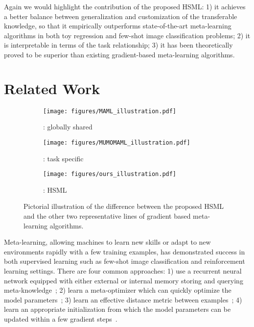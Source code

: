 \documentclass{article}
\begin{document}
Again we would highlight the contribution of the proposed HSML: 1) it achieves a better balance between generalization and customization of the transferable knowledge, so that it empirically outperforms state-of-the-art meta-learning algorithms in both toy regression and few-shot image classification problems; 2) it is interpretable in terms of the task relationship; 3) it has been theoretically proved to be superior than existing gradient-based meta-learning algorithms. \section{Related Work}
\begin{figure}[t]
	\centering
	\begin{subfigure}[c]{0.155\textwidth}
		\centering
		\texttt{[image: figures/MAML\_illustration.pdf]}
		\caption{\label{fig:maml}: globally shared}
	\end{subfigure}
	\begin{subfigure}[c]{0.155\textwidth}
		\centering
		\texttt{[image: figures/MUMOMAML\_illustration.pdf]}
		\caption{\label{fig:mumomaml}: task specific}
	\end{subfigure}
		\begin{subfigure}[c]{0.155\textwidth}
		\centering
		\texttt{[image: figures/ours\_illustration.pdf]}
		\caption{\label{fig:hsml}: HSML}
	\end{subfigure}
	\caption{Pictorial illustration of the difference between the proposed HSML and the other two representative lines of gradient based meta-learning algorithms.}
	
	\label{fig:illustration}
\end{figure}
Meta-learning, allowing machines to learn new skills or adapt to new environments rapidly with a few training examples, has demonstrated success in both supervised learning such as few-shot image classification and reinforcement learning settings.
There are four common approaches: 1) use a recurrent neural network equipped with either external or internal memory storing and querying meta-knowledge~\cite{munkhdalai2017meta,santoro2016meta,munkhdalai2018rapid,mishra2018simple}; 2) learn a meta-optimizer which can quickly optimize the model parameters~\cite{ravi2016optimization,andrychowicz2016learning,li2016learning}; 3) learn an effective distance metric between examples~\cite{snell2017prototypical,vinyals2016matching,yang2018learning};
4) learn an appropriate initialization from which the model parameters can be updated within a few gradient steps~\cite{finn2017model,finn2018probabilistic,lee2018gradient}.
\end{document}
